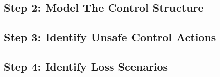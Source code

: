 \documentclass[../../main/main.tex]{subfiles}
\begin{document}
\subsection{Step 2: Model The Control Structure}


\subsection{Step 3: Identify Unsafe Control Actions}
\subsection{Step 4: Identify Loss Scenarios}
\end{document}
